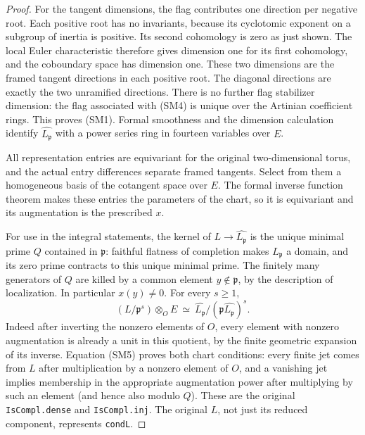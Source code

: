 \begin{proof}
For the tangent dimensions, the flag contributes one
direction per negative root. Each positive root has no
invariants, because its cyclotomic exponent on a subgroup
of inertia is positive. Its second cohomology is zero
as just shown. The local Euler characteristic therefore
gives dimension one for its first cohomology, and the
coboundary space has dimension one. These two dimensions
are the framed tangent directions in each positive root.
The diagonal directions are exactly the two unramified
directions. There is no further flag stabilizer dimension:
the flag associated with (SM4) is unique over the
Artinian coefficient rings. This proves (SM1).
Formal smoothness and the dimension calculation identify
\(\widehat{L_{\mathfrak p}}\) with a power series ring
in fourteen variables over \(E\).

All representation entries are equivariant for the original
two-dimensional torus, and the actual entry differences
separate framed tangents. Select from them a homogeneous
basis of the cotangent space over \(E\). The formal inverse
function theorem makes these entries the parameters of
the chart, so it is equivariant and its augmentation is
the prescribed \(x\).

For use in the integral statements, the kernel of
\(L\to\widehat{L_{\mathfrak p}}\) is the unique minimal
prime \(Q\) contained in \(\mathfrak p\): faithful
flatness of completion makes \(L_{\mathfrak p}\) a
domain, and its zero prime contracts to this unique
minimal prime. The finitely many generators of \(Q\)
are killed by a common element \(y\notin\mathfrak p\),
by the description of localization. In particular
\(x(y)\ne0\). For every \(s\ge1\),
\[
 (L/\mathfrak p^s)\otimes_O E
      \ \simeq\ \widehat{L_{\mathfrak p}}/
                       (\mathfrak p\widehat{L_{\mathfrak p}})^s .
                                                               \tag{SM5}
\]
Indeed after inverting the nonzero elements of \(O\),
every element with nonzero augmentation is already a
unit in this quotient, by the finite geometric expansion
of its inverse. Equation (SM5) proves both chart
conditions: every finite jet comes from \(L\) after
multiplication by a nonzero element of \(O\), and a
vanishing jet implies membership in the appropriate
augmentation power after multiplying by such an element
(and hence also modulo \(Q\)). These are the original
\texttt{IsCompl.dense} and \texttt{IsCompl.inj}.
The original \(L\), not just its reduced component,
represents \texttt{condL}.


\end{proof}
